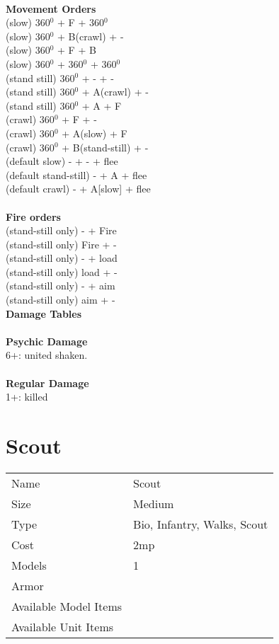 \ \\ {\bf Movement Orders } \\
(slow) 360$^0$ + F + 360$^0$ \\
(slow) 360$^0$ + B(crawl) + - \\
(slow) 360$^0$ + F + B \\
(slow) 360$^0$ + 360$^0$ + 360$^0$ \\
(stand still) 360$^0$ + - + -  \\
(stand still) 360$^0$ + A(crawl) + - \\
(stand still) 360$^0$ + A + F \\
(crawl) 360$^0$ + F + - \\
(crawl) 360$^0$ + A(slow) + F \\
(crawl) 360$^0$ + B(stand-still) + - \\
(default slow) - + - + flee \\
(default stand-still) - + A + flee \\
(default crawl) - + A[slow] + flee \\
\ \\ {\bf Fire orders } \\
(stand-still only) - + Fire \\
(stand-still only) Fire + -  \\
(stand-still only) - + load \\
(stand-still only) load + - \\
(stand-still only) - + aim \\
(stand-still only) aim + -  \\



{\bf Damage Tables} \\
\ \\ {\bf Psychic Damage } \\
6+: united shaken. \\
\ \\ {\bf Regular Damage } \\
1+: killed \\









\pagebreak

\section{ Scout }

\begin{tabular}{ll}
  Name & Scout \\
  Size & Medium\\
  Type & Bio, Infantry, Walks, Scout\\
  Cost & 2mp\\
  Models & 1\\
  Armor & \\
  Available Model Items &  \\
  Available Unit Items &  \\
\end{tabular}

